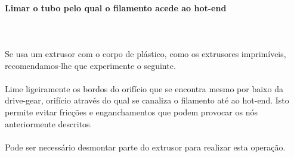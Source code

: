 \documentclass[11pt,a4paper]{article}
\begin{document}
			\paragraph{Limar o tubo pelo qual o filamento acede ao hot-end}\mbox{}\\\\
Se usa um extrusor com o corpo de plástico, como os extrusores imprimíveis, recomendamos-lhe que experimente o seguinte. 
\\\\
Lime ligeiramente os bordos do orifício que se encontra mesmo por baixo da drive-gear, orifício através do qual se canaliza o filamento até ao hot-end. Isto permite evitar fricções e enganchamentos que podem provocar os nós anteriormente descritos. 
\\\\
Pode ser necessário desmontar parte do extrusor para realizar esta operação.
\end{document}
